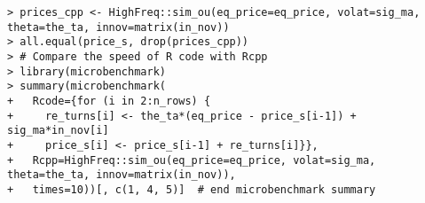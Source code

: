 \documentclass[10pt]{beamer}\usepackage[]{graphicx}\usepackage[]{color}
\makeatletter
\newenvironment{kframe}{%
 \def\at@end@of@kframe{}%
 \ifinner\ifhmode%
  \def\at@end@of@kframe{\end{minipage}}%
  \begin{minipage}{\columnwidth}%
 \fi\fi%
 \def\FrameCommand##1{\hskip\@totalleftmargin \hskip-\fboxsep
 \colorbox{shadecolor}{##1}\hskip-\fboxsep
     \hskip-\linewidth \hskip-\@totalleftmargin \hskip\columnwidth}%
 \MakeFramed {\advance\hsize-\width
   \@totalleftmargin\z@ \linewidth\hsize
   \@setminipage}}%
 {\par\unskip\endMakeFramed%
 \at@end@of@kframe}
\newenvironment{knitrout}{}{} %
\makeatother
\begin{document}
\begin{frame}[fragile,t]{\subsecname}
\begin{block}{}
\begin{columns}[T]
\begin{knitrout}
\begin{kframe}
\begin{verbatim}
> prices_cpp <- HighFreq::sim_ou(eq_price=eq_price, volat=sig_ma, theta=the_ta, innov=matrix(in_nov))
> all.equal(price_s, drop(prices_cpp))
> # Compare the speed of R code with Rcpp
> library(microbenchmark)
> summary(microbenchmark(
+   Rcode={for (i in 2:n_rows) {
+     re_turns[i] <- the_ta*(eq_price - price_s[i-1]) + sig_ma*in_nov[i]
+     price_s[i] <- price_s[i-1] + re_turns[i]}},
+   Rcpp=HighFreq::sim_ou(eq_price=eq_price, volat=sig_ma, theta=the_ta, innov=matrix(in_nov)),
+   times=10))[, c(1, 4, 5)]  # end microbenchmark summary
\end{verbatim}
\end{kframe}
\end{knitrout}
  \end{columns}
\end{block}

\end{frame}


\end{document}
